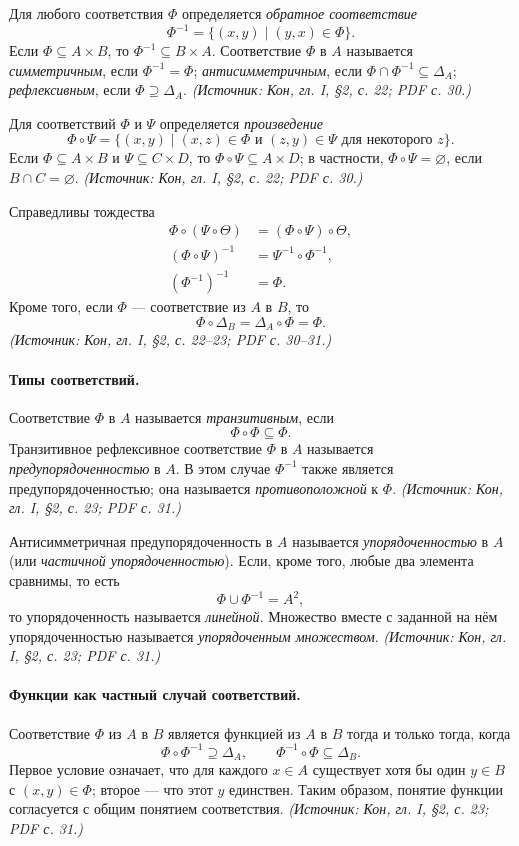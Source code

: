 \documentclass[a4paper,12pt]{article}
\begin{document}
Для любого соответствия \(\Phi\) определяется \emph{обратное соответствие}
\[
\Phi^{-1}=\{(x,y)\mid (y,x)\in\Phi\}.
\]
Если \(\Phi\subseteq A\times B\), то \(\Phi^{-1}\subseteq B\times A\). Соответствие \(\Phi\) в \(A\) называется \emph{симметричным}, если \(\Phi^{-1}=\Phi\); \emph{антисимметричным}, если \(\Phi\cap\Phi^{-1}\subseteq\Delta_A\); \emph{рефлексивным}, если \(\Phi\supseteq\Delta_A\).
\textit{(Источник: Кон, гл. I, §2, с. 22; PDF с. 30.)}

Для соответствий \(\Phi\) и \(\Psi\) определяется \emph{произведение}
\[
\Phi\circ\Psi=\{(x,y)\mid (x,z)\in\Phi\text{ и }(z,y)\in\Psi\text{ для некоторого }z\}.
\]
Если \(\Phi\subseteq A\times B\) и \(\Psi\subseteq C\times D\), то \(\Phi\circ\Psi\subseteq A\times D\); в частности, \(\Phi\circ\Psi=\varnothing\), если \(B\cap C=\varnothing\).
\textit{(Источник: Кон, гл. I, §2, с. 22; PDF с. 30.)}

Справедливы тождества
\[
\begin{aligned}
\Phi\circ(\Psi\circ\Theta)&=(\Phi\circ\Psi)\circ\Theta,\\
(\Phi\circ\Psi)^{-1}&=\Psi^{-1}\circ\Phi^{-1},\\
(\Phi^{-1})^{-1}&=\Phi.
\end{aligned}
\]
Кроме того, если \(\Phi\) — соответствие из \(A\) в \(B\), то
\[
\Phi\circ\Delta_B=\Delta_A\circ\Phi=\Phi.
\]
\textit{(Источник: Кон, гл. I, §2, с. 22--23; PDF с. 30--31.)}

\paragraph{Типы соответствий.}
Соответствие \(\Phi\) в \(A\) называется \emph{транзитивным}, если
\[
\Phi\circ\Phi\subseteq\Phi.
\]
Транзитивное рефлексивное соответствие \(\Phi\) в \(A\) называется \emph{предупорядоченностью} в \(A\). В этом случае \(\Phi^{-1}\) также является предупорядоченностью; она называется \emph{противоположной} к \(\Phi\).
\textit{(Источник: Кон, гл. I, §2, с. 23; PDF с. 31.)}

Антисимметричная предупорядоченность в \(A\) называется \emph{упорядоченностью} в \(A\) (или \emph{частичной упорядоченностью}). Если, кроме того, любые два элемента сравнимы, то есть
\[
\Phi\cup\Phi^{-1}=A^2,
\]
то упорядоченность называется \emph{линейной}. Множество вместе с заданной на нём упорядоченностью называется \emph{упорядоченным множеством}.
\textit{(Источник: Кон, гл. I, §2, с. 23; PDF с. 31.)}

\paragraph{Функции как частный случай соответствий.}
Соответствие \(\Phi\) из \(A\) в \(B\) является функцией из \(A\) в \(B\) тогда и только тогда, когда
\[
\Phi\circ\Phi^{-1}\supseteq\Delta_A,
\qquad
\Phi^{-1}\circ\Phi\subseteq\Delta_B.
\]
Первое условие означает, что для каждого \(x\in A\) существует хотя бы один \(y\in B\) с \((x,y)\in\Phi\); второе — что этот \(y\) единствен. Таким образом, понятие функции согласуется с общим понятием соответствия.
\textit{(Источник: Кон, гл. I, §2, с. 23; PDF с. 31.)}
\end{document}
